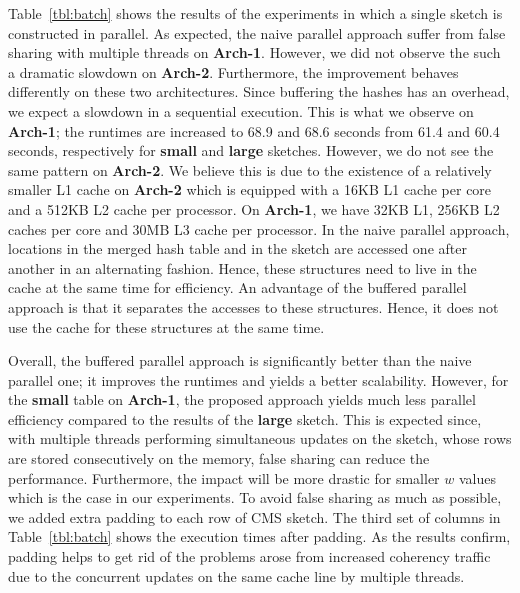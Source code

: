 \documentclass[10pt, conference, compsocconf]{IEEEtran}
\begin{document}
Table~\ref{tbl:batch} shows the results of the experiments in which a single sketch is constructed in parallel. As expected, the naive parallel approach suffer from false sharing with multiple threads on {\bf Arch-1}. However, we did not observe the such a dramatic slowdown on {\bf Arch-2}. Furthermore, the improvement behaves differently on these two architectures. Since buffering the hashes has an overhead, we expect a slowdown in a sequential execution. This is what we observe on {\bf Arch-1}; the runtimes are increased to  68.9 and 68.6 seconds from 61.4 and
 60.4 seconds, respectively for {\bf small} and {\bf large} sketches. However, we do not see the same pattern on {\bf Arch-2}.
We believe this is due to the existence of a relatively smaller L1 cache on {\bf Arch-2} which is equipped with a 16KB L1 cache per core and a 512KB L2 cache per processor. On {\bf Arch-1}, we have 32KB L1, 256KB L2 caches per core and 30MB L3 cache per processor. In the naive parallel approach, locations in the merged hash table and in the sketch are accessed one after another in an alternating fashion. Hence, these structures need to live in the cache at the same time for efficiency. An advantage of the buffered parallel approach is that it separates the accesses to these structures. Hence, it does not use the cache for these structures at the same time. 

Overall, the buffered parallel approach is significantly better than the naive parallel one; it improves the runtimes and yields a better scalability. However, for the {\bf small} table on {\bf Arch-1}, the proposed approach yields much less parallel efficiency compared to the results of the {\bf large} sketch. This is expected since, with multiple threads performing simultaneous updates on the sketch, whose rows are stored consecutively on the memory, false sharing can reduce the performance. Furthermore, the impact will be more drastic for smaller $w$ values which is the case in our experiments. To avoid false sharing as much as possible, we added extra padding to each row of CMS sketch. The third set of columns in Table~\ref{tbl:batch} shows the execution times after padding. As the results confirm, padding helps to get rid of the problems arose from increased coherency traffic due to the concurrent updates on the same cache line by multiple threads. 
\end{document}
